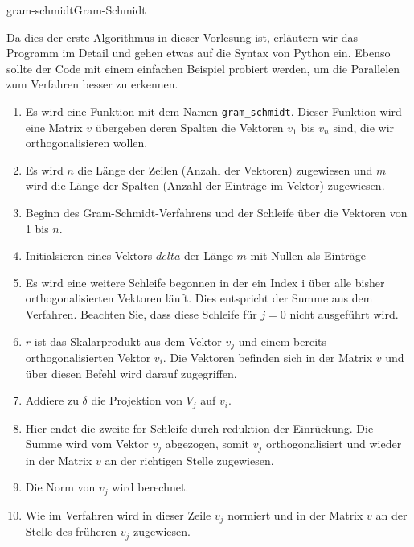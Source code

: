\begin{Algorithmus*}{gram-schmidt}{Gram-Schmidt}
  
\end{Algorithmus*}

\begin{intro}
  Da dies der erste Algorithmus in dieser Vorlesung ist, erläutern wir
  das Programm im Detail und gehen etwas auf die Syntax von Python
  ein. Ebenso sollte der Code mit einem einfachen Beispiel
  probiert werden, um die Parallelen zum Verfahren besser zu erkennen.
  \begin{enumerate}
  \item Es wird eine Funktion mit dem Namen
    \lstinline!gram_schmidt!. Dieser Funktion wird eine Matrix $v$
    übergeben deren Spalten die Vektoren $v_1$ bis $v_n$ sind, die wir
    orthogonalisieren wollen.
  \item Es wird $n$ die Länge der Zeilen (Anzahl der Vektoren)
    zugewiesen und $m$ wird die Länge der Spalten (Anzahl der Einträge
    im Vektor) zugewiesen.
  \item Beginn des Gram-Schmidt-Verfahrens und der Schleife über die
    Vektoren von 1 bis $n$.
   \item Initialsieren eines Vektors $delta$ der Länge $m$ mit Nullen als Einträge
   \item Es wird eine weitere Schleife begonnen in der ein Index i
     über alle bisher orthogonalisierten Vektoren läuft. Dies
     entspricht der Summe aus dem Verfahren. Beachten Sie, dass diese
     Schleife für $j=0$ nicht ausgeführt wird.
   \item $r$ ist das Skalarprodukt aus dem Vektor $v_j$ und einem
     bereits orthogonalisierten Vektor $v_i$.  Die Vektoren befinden sich in
     der Matrix $v$ und über diesen Befehl wird darauf zugegriffen.
   \item Addiere zu $\delta$ die Projektion von $V_j$ auf $v_i$.
   \item Hier endet die zweite for-Schleife durch reduktion der
     Einrückung.  Die Summe wird vom Vektor $v_j$ abgezogen, somit
     $v_j$ orthogonalisiert und wieder in der Matrix $v$ an der
     richtigen Stelle zugewiesen.
   \item  Die Norm von $v_j$ wird berechnet.  
   \item Wie im Verfahren wird in  dieser Zeile $v_j$ normiert und in der Matrix $v$ an der Stelle des
       früheren $v_j$ zugewiesen.
  \end{enumerate}
\end{intro}

